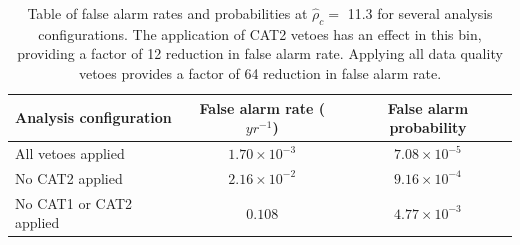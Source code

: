 \begin{table}[!ht]%
  \begin{center}
    \begin{tabular}{lcc}
      \hline
      Analysis configuration & False alarm rate ($yr^{-1}$) & False alarm probability \\ \hline
      All vetoes applied & $1.70\times10^{-3}$  & $7.08\times10^{-5}$ \\
      No CAT2 applied & $2.16\times10^{-2}$ & $9.16\times10^{-4}$ \\
      No CAT1 or CAT2 applied & $0.108$ & $4.77\times10^{-3}$ \\ \hline
    \end{tabular}
  \end{center}
  \caption[Edge bin FAR - GW151226 analysis]{Table of false alarm rates and probabilities at $\hat{\rho}_{c} =$ 11.3 %
           for several analysis configurations. The application of CAT2 vetoes %
           has an effect in this bin, providing a factor of 12 reduction in false %
           alarm rate. Applying all data quality vetoes provides a factor of 64 %
           reduction in false alarm rate.}
  \label{table:151226-edge-far}
\end{table}


